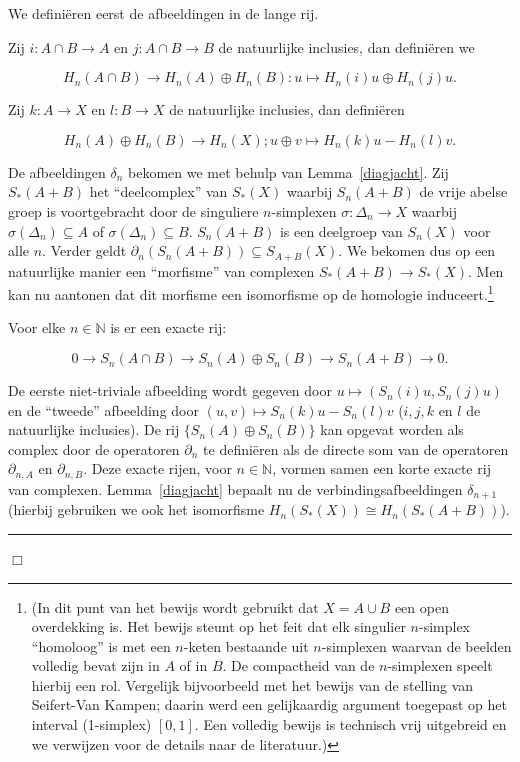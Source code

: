 \documentclass[12pt]{book}
\newcommand{\N}{\mathbb{N}}
\newcommand{\B}{\rule{1mm}{0mm} \hfill $\Box$ }
\begin{document}
We defini\"eren eerst de afbeeldingen in de lange rij.

Zij $i:A\cap B\to A$ en $j:A\cap B\to B$ de natuurlijke inclusies, dan defini\"{e}ren we

$$H_{n}(A\cap B)\to H_{n}(A)\oplus H_{n}(B): u\mapsto H_{n}(i)u\oplus  H_{n}(j)u.$$

Zij $k:A\to X$ en $l:B\to X$ de natuurlijke inclusies, dan defini\"{e}ren

$$H_{n}(A)\oplus H_{n}(B)\to H_{n}(X); u\oplus v\mapsto H_{n}(k)u-H_{n}(l)v.$$

De afbeeldingen $\delta_{n}$ bekomen we met behulp van  Lemma~\ref{diagjacht}.
Zij $S_{*}(A+B)$ het ``deelcomplex'' van $S_{*}(X)$ waarbij $S_{n}(A+B)$
de vrije abelse groep is voortgebracht door de singuliere $n$-simplexen $\sigma:\Delta_{n}\to X$
waarbij $\sigma(\Delta_{n})\subseteq A$ of $\sigma(\Delta_{n})\subseteq B$. $S_{n}(A+B)$ is een
deelgroep van $S_{n}(X)$ voor alle $n$. Verder geldt $\partial_{n}(S_{n}(A+B))\subseteq
S_{A+B}(X)$. We bekomen dus op een natuurlijke manier een ``morfisme'' van complexen $S_{*}(A+B)\to
S_{*}(X)$. Men kan nu aantonen dat dit morfisme een isomorfisme op de homologie induceert.\footnote{(In dit punt van het bewijs wordt gebruikt dat $X=A\cup B$ een open overdekking is. Het bewijs steunt op het feit dat elk singulier $n$-simplex ``homoloog'' is met een $n$-keten bestaande uit $n$-simplexen waarvan de beelden volledig
bevat zijn in $A$ of in $B$. De compactheid van de $n$-simplexen speelt hierbij een rol. Vergelijk bijvoorbeeld met het bewijs van de stelling van Seifert-Van Kampen; daarin werd een gelijkaardig argument toegepast op het interval (1-simplex) $[0,1]$. Een volledig bewijs is technisch vrij uitgebreid en we
verwijzen voor de details naar de literatuur.)}

Voor elke $n\in \N$ is er een exacte rij:

$$0\to S_{n}(A\cap B)\to S_{n}(A)\oplus S_{n}(B) \to S_{n}(A+B) \to 0.$$

De eerste niet-triviale afbeelding wordt gegeven door $u\mapsto (S_{n}(i)u, S_{n}(j)u)$ en de ``tweede'' afbeelding
door $(u,v)\mapsto S_{n}(k)u-S_{n}(l)v$ ($i,j,k$ en $l$ de natuurlijke inclusies). De rij
$\{S_{n}(A)\oplus S_{n}(B)\}$ kan opgevat worden als complex door de operatoren $\partial_{n}$ te
defini\"eren als de directe som van de operatoren $\partial_{n,A}$ en $\partial_{n,B}$. Deze exacte rijen, voor $n \in \mathbb{N}$, 
vormen samen een korte exacte rij van complexen. Lemma~\ref{diagjacht} bepaalt nu de verbindingsafbeeldingen $\delta_{n+1}$
(hierbij gebruiken we ook het isomorfisme $H_{n}(S_{*}(X))\cong H_{n}(S_{*}(A+B))$).
\B
\end{document}
